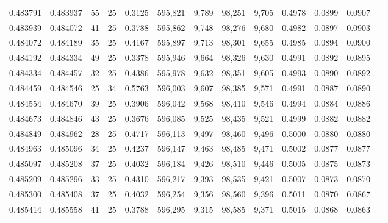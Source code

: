 \begin{tabular}{rrrrrrrrrrrrr}
0.483791 & 0.483937 &    55 &  25 &                                     0.3125 & 595,821 &   9,789 &  98,251 &   9,705 & 0.4978 & 0.0899 & 0.0907 \\
0.483939 & 0.484072 &    41 &  25 &                                     0.3788 & 595,862 &   9,748 &  98,276 &   9,680 & 0.4982 & 0.0897 & 0.0903 \\
0.484072 & 0.484189 &    35 &  25 &                                     0.4167 & 595,897 &   9,713 &  98,301 &   9,655 & 0.4985 & 0.0894 & 0.0900 \\
0.484192 & 0.484334 &    49 &  25 &                                     0.3378 & 595,946 &   9,664 &  98,326 &   9,630 & 0.4991 & 0.0892 & 0.0895 \\
0.484334 & 0.484457 &    32 &  25 &                                     0.4386 & 595,978 &   9,632 &  98,351 &   9,605 & 0.4993 & 0.0890 & 0.0892 \\
0.484459 & 0.484546 &    25 &  34 &                                     0.5763 & 596,003 &   9,607 &  98,385 &   9,571 & 0.4991 & 0.0887 & 0.0890 \\
0.484554 & 0.484670 &    39 &  25 &                                     0.3906 & 596,042 &   9,568 &  98,410 &   9,546 & 0.4994 & 0.0884 & 0.0886 \\
0.484673 & 0.484846 &    43 &  25 &                                     0.3676 & 596,085 &   9,525 &  98,435 &   9,521 & 0.4999 & 0.0882 & 0.0882 \\
0.484849 & 0.484962 &    28 &  25 &                                     0.4717 & 596,113 &   9,497 &  98,460 &   9,496 & 0.5000 & 0.0880 & 0.0880 \\
0.484963 & 0.485096 &    34 &  25 &                                     0.4237 & 596,147 &   9,463 &  98,485 &   9,471 & 0.5002 & 0.0877 & 0.0877 \\
0.485097 & 0.485208 &    37 &  25 &                                     0.4032 & 596,184 &   9,426 &  98,510 &   9,446 & 0.5005 & 0.0875 & 0.0873 \\
0.485209 & 0.485296 &    33 &  25 &                                     0.4310 & 596,217 &   9,393 &  98,535 &   9,421 & 0.5007 & 0.0873 & 0.0870 \\
0.485300 & 0.485408 &    37 &  25 &                                     0.4032 & 596,254 &   9,356 &  98,560 &   9,396 & 0.5011 & 0.0870 & 0.0867 \\
0.485414 & 0.485558 &    41 &  25 &                                     0.3788 & 596,295 &   9,315 &  98,585 &   9,371 & 0.5015 & 0.0868 & 0.0863 \\

\end{tabular}

